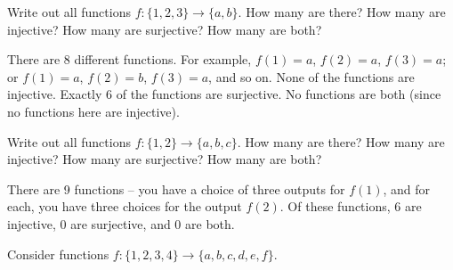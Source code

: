 \begin{questions}
\question Write out all functions $f: \{1,2,3\} \to \{a,b\}$.  How many are there?  How many are injective?  How many are surjective?  How many are both?

	\begin{answer}
	There are 8 different functions.  For example, $f(1) = a$, $f(2) = a$, $f(3) = a$; or $f(1) = a$, $f(2) = b$, $f(3) = a$, and so on.  None of the functions are injective.  Exactly 6 of the functions are surjective.  No functions are both (since no functions here are injective).
	\end{answer}




\question Write out all functions $f: \{1,2\} \to \{a,b,c\}$.  How many are there?  How many are injective?  How many are surjective?  How many are both?

	\begin{answer}
	There are 9 functions -- you have a choice of three outputs for $f(1)$, and for each, you have three choices for the output $f(2)$.  Of these functions, 6 are injective, 0 are surjective, and 0 are both.
	\end{answer}






\question Consider functions $f: \{1,2,3,4\} \to \{a,b,c,d,e,f\}$.

	\begin{answer}
\end{answer}
\end{questions}
